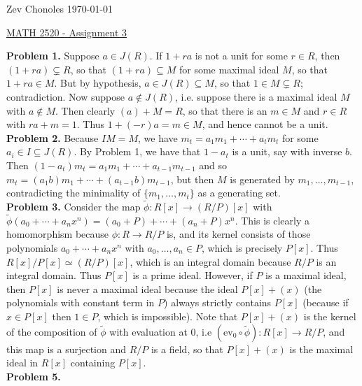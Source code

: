 \documentclass[11pt]{article}
\newcommand{\num}[1]{\noindent \textbf{#1}}
\theoremstyle{definition}
\begin{document}
\noindent Zev Chonoles \hfill \today\\[-0.4in]
\begin{center}
\noindent \underline{MATH 2520 - Assignment 3}
\end{center}

\num{Problem 1.} Suppose $a\in J(R)$. If $1+ra$ is not a unit for some $r\in
R$, then $(1+ra)\subsetneq R$, so that $(1+ra)\subseteq M$ for some maximal
ideal $M$, so that $1+ra\in M$. But by hypothesis, $a\in J(R)\subseteq M$,
so that $1\in M\subsetneq R$; contradiction. Now suppose $a\notin J(R)$,
i.e. suppose there is a maximal ideal $M$ with $a\notin M$. Then clearly
$(a)+M=R$, so that there is an $m\in M$ and $r\in R$ with $ra+m=1$. Thus
$1+(-r)a=m\in M$, and hence cannot be a unit.       \\

\num{Problem 2.} Because $IM=M$, we have $m_t=a_1m_1+\cdots+a_tm_t$ for some
$a_i\in I\subseteq J(R)$. By Problem 1, we have that $1-a_t$ is a unit,
say with inverse $b$. Then $(1-a_t)m_t=a_1m_1+\cdots+a_{t-1}m_{t-1}$ and
so $m_t=(a_1b)m_1+\cdots+(a_{t-1}b)m_{t-1}$, but then $M$ is generated by
$m_1,\ldots,m_{t-1}$, contradicting the minimality of $\{m_1,\ldots,m_t\}$
as a generating set.       \\

\num{Problem 3.} Consider the map $\tilde{\phi}:R[x]\rightarrow(R/P)[x]$ with
$\tilde{\phi}(a_0+\cdots+a_nx^n)=(a_0+P)+\cdots+(a_n+P)x^n$. This is clearly
a homomorphism because $\phi:R\rightarrow R/P$ is, and its kernel consists
of those polynomials $a_0+\cdots+a_nx^n$ with $a_0,\ldots,a_n\in P$, which is
precisely $P[x]$. Thus $R[x]/P[x]\simeq (R/P)[x]$, which is an integral domain
because $R/P$ is an integral domain. Thus $P[x]$ is a prime ideal. However, if
$P$ is a maximal ideal, then $P[x]$ is never a maximal ideal because the ideal
$P[x]+(x)$ (the polynomials with constant term in $P$) always strictly contains
$P[x]$ (because if $x\in P[x]$ then $1\in P$, which is impossible). Note
that $P[x]+(x)$ is the kernel of the composition of $\tilde{\phi}$ with
evaluation at 0, i.e $(\text{ev}_0\circ\tilde{\phi}):R[x]\rightarrow R/P$,
and this map is a surjection and $R/P$ is a field, so that $P[x]+(x)$ is
the maximal ideal in $R[x]$ containing $P[x]$.       \\
\num{Problem 5.}\\
\end{document}
